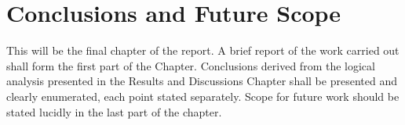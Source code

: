 \chapter{Conclusions and Future Scope}
This will be the final chapter of the report. A brief report of the work carried out shall form
the first part of the Chapter. Conclusions derived from the logical analysis presented in the
Results and Discussions Chapter shall be presented and clearly enumerated, each point stated
separately. Scope for future work should be stated lucidly in the last part of the chapter.\\